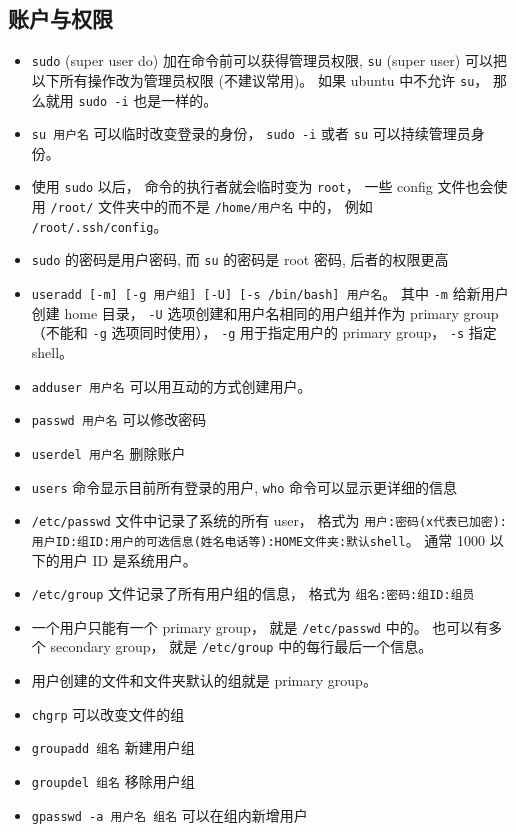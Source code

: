 \subsection{账户与权限}
\begin{itemize}
\item \verb`sudo` (super user do) 加在命令前可以获得管理员权限, \verb`su` (super user) 可以把以下所有操作改为管理员权限 (不建议常用)。 如果 ubuntu 中不允许 \verb|su|， 那么就用 \verb|sudo -i| 也是一样的。
\item \verb`su 用户名` 可以临时改变登录的身份， \verb|sudo -i| 或者 \verb|su| 可以持续管理员身份。
\item 使用 \verb|sudo| 以后， 命令的执行者就会临时变为 \verb|root|， 一些 config 文件也会使用 \verb|/root/| 文件夹中的而不是 \verb|/home/用户名| 中的， 例如 \verb|/root/.ssh/config|。
\item \verb`sudo` 的密码是用户密码, 而 \verb`su` 的密码是 root 密码, 后者的权限更高
\item \verb`useradd [-m] [-g 用户组] [-U] [-s /bin/bash] 用户名`。 其中 \verb|-m| 给新用户创建 home 目录， \verb|-U| 选项创建和用户名相同的用户组并作为 primary group （不能和 \verb|-g| 选项同时使用）， \verb|-g| 用于指定用户的 primary group， \verb|-s| 指定 shell。
\item \verb|adduser 用户名| 可以用互动的方式创建用户。
\item \verb`passwd 用户名` 可以修改密码
\item \verb`userdel 用户名` 删除账户
\item \verb`users` 命令显示目前所有登录的用户, \verb`who` 命令可以显示更详细的信息
\item \verb`/etc/passwd` 文件中记录了系统的所有 user， 格式为 \verb|用户:密码(x代表已加密):用户ID:组ID:用户的可选信息(姓名电话等):HOME文件夹:默认shell|。 通常 1000 以下的用户 ID 是系统用户。
\item \verb|/etc/group| 文件记录了所有用户组的信息， 格式为 \verb|组名:密码:组ID:组员|
\item 一个用户只能有一个 primary group， 就是 \verb|/etc/passwd| 中的。 也可以有多个 secondary group， 就是 \verb|/etc/group| 中的每行最后一个信息。
\item 用户创建的文件和文件夹默认的组就是 primary group。
\item \verb|chgrp| 可以改变文件的组
\item \verb|groupadd 组名| 新建用户组
\item \verb`groupdel 组名` 移除用户组
\item \verb`gpasswd -a 用户名 组名` 可以在组内新增用户

\end{itemize}
